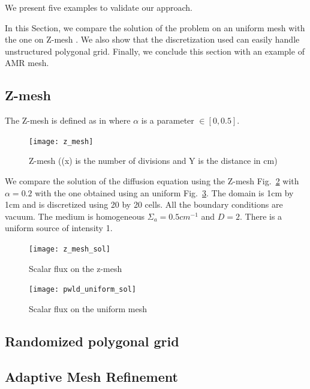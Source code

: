 \documentclass[preprint,10pt]{elsarticle}
\newcommand{\fig}[1]{Fig.~\ref{#1}}                      %
\renewcommand{\(}{\left(}
\renewcommand{\)}{\right)}
\renewcommand{\[}{\left[}
\renewcommand{\]}{\right]}
\begin{document}
We present five examples to validate our approach.  

In this Section, we compare the solution of the problem on an uniform mesh
with the one on Z-mesh \cite{Stone2003}. We also show that the
discretization used can easily handle unstructured polygonal grid. Finally, we
conclude this section with an example of AMR mesh.

\subsection{Z-mesh}
The Z-mesh is defined as in  where $\alpha$ is a parameter
$\in [0,0.5]$. 
\begin{figure}[H]
  \centering
  \texttt{[image: z\_mesh]}
  \caption{Z-mesh ((x) is the number of divisions and Y is the distance in cm)}
  \label{fig_z_mesh}
\end{figure}    
We compare the solution of the diffusion equation using the Z-mesh
\fig{z_mesh_sol} with $\alpha=0.2$ with the one obtained using an uniform \fig{u_mesh_sol}. 
The domain is 1cm by 1cm and is discretized using 20 by 20 cells. All the 
boundary conditions are vacuum. The medium is homogeneous $\Sigma_a = 0.5 cm^{-1}$ 
and $D=2$. There is a uniform source of intensity 1.                  
\begin{figure}[H]
  \centering
  \texttt{[image: z\_mesh\_sol]}
  \caption{Scalar flux on the z-mesh}
  \label{z_mesh_sol}
\end{figure}
\begin{figure}[H]
  \centering
  \texttt{[image: pwld\_uniform\_sol]}
  \caption{Scalar flux on the uniform mesh}
  \label{u_mesh_sol}
\end{figure}

\subsection{Randomized polygonal grid}

\subsection{Adaptive Mesh Refinement}
\end{document}
